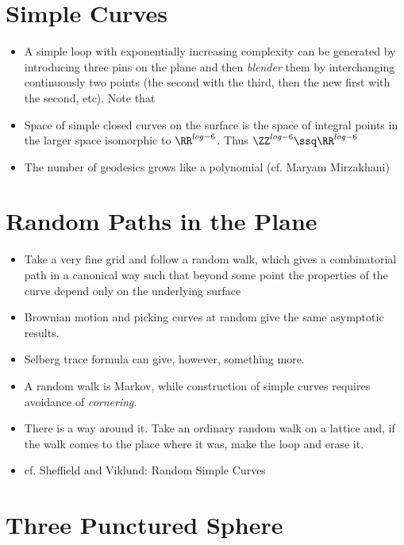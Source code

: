 \documentclass[11pt]{scrartcl}
\begin{document}
\section{Simple Curves}

\begin{itemize}
\item Α simple loop with exponentially increasing complexity can be
  generated by introducing three pins on the plane and then
  \textit{blender} them by interchanging continuously two points (the
  second with the third, then the new first with the second, etc). Note that
\item Space of simple closed curves on the surface is the space of
  integral points in the larger space isomorphic to $\RR ^{log -
    6}$. Thus $\ZZ^{log -6} \ssq \RR ^{log -6}$

\item The number of geodesics grows like a polynomial (cf. Maryam Mirzakhani)
\end{itemize}

\section{Random Paths in the Plane}

\begin{itemize}
\item Take a very fine grid and follow a random walk, which gives a
  combinatorial path in a canonical way such that beyond some point
  the properties of the curve depend only on the underlying surface
\item Brownian motion and picking curves at random give the same
  asymptotic results.
\item Selberg trace formula can give, however, something more.
\item A random walk is Markov, while construction of simple curves
  requires avoidance of \textit{cornering}.
\item There is a way around it. Take an ordinary random walk on a lattice and, if the walk comes
  to the place where it was, make the loop and erase it.
\item cf. Sheffield and Viklund: Random Simple Curves

\end{itemize}

\section{Three Punctured Sphere}
\end{document}

